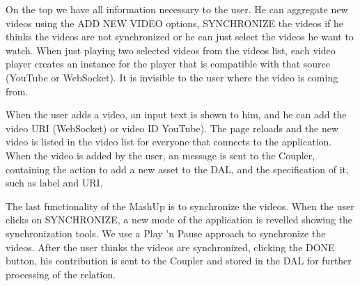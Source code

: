 On the top we have all information necessary to the user. He can aggregate new videos using the ADD NEW VIDEO options, SYNCHRONIZE the videos if he thinks the videos are not synchronized or he can just select the videos he want to watch. When just playing two selected videos from the videos list, each video player creates an instance for the player that is compatible with that source (YouTube or WebSocket). It is invisible to the user where the video is coming from.

When the user adds a video, an input text is shown to him, and he can add the video URI (WebSocket) or video ID YouTube). The page reloads and the new video is listed in the video list for everyone that connects to the application. When the video is added by the user, an message is sent to the Coupler, containing the action to add a new asset to the DAL, and the specification of it, such as label and URI.

The last functionality of the MashUp is to synchronize the videos. When the user clicks on SYNCHRONIZE, a new mode of the application is revelled showing the synchronization tools. We use a Play ’n Pause approach to synchronize the videos. After the user thinks the videos are synchronized, clicking the DONE button, his contribution is sent to the Coupler and stored in the DAL for further processing of the relation.